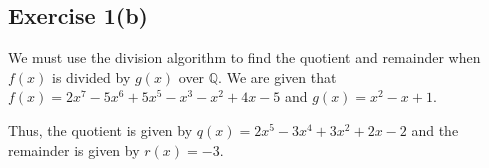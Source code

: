 \subsection*{Exercise 1(b)}
We must use the division algorithm to find the quotient and remainder when $f(x)$ is divided by $g(x)$ over $\mathbb{Q}$. We are given that $f(x) = 2x^7 - 5x^6 + 5x^5 - x^3 - x^2 + 4x - 5$ and $g(x) = x^2 - x + 1$.


Thus, the quotient is given by $q(x) = 2x^5 - 3x^4 + 3x^2 + 2x - 2$ and the remainder is given by $r(x) = -3$.